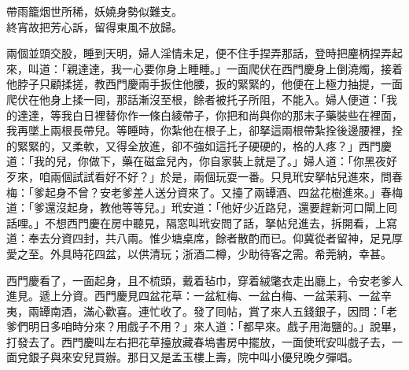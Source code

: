\begin{myquote}
帶雨籠烟世所稀，妖嬈身勢似難支。\\終宵故把芳心訴，留得東風不放歸。
\end{myquote}

兩個並頭交股，睡到天明，婦人淫情未足，便不住手捏弄那話，登時把麈柄捏弄起來，叫道：「親達達，我一心要你身上睡睡。」一面爬伏在西門慶身上倒澆燭，接着他脖子只顧揉搓，教西門慶兩手扳住他腰，扳的緊緊的，他便在上極力抽提，一面爬伏在他身上揉一囘，那話漸沒至根，餘者被托子所阻，不能入。婦人便道：「我的達達，等我白日裡替你作一條白綾帶子，你把和尚與你的那末子藥裝些在裡面，我再墜上兩根長帶兒。等睡時，你紮他在根子上，卻拏這兩根帶紮拴後邊腰裡，拴的緊緊的，又柔軟，又得全放進，卻不強如這托子硬硬的，格的人疼？」{}西門慶道：「我的兒，你做下，藥在磁盒兒內，你自家裝上就是了。」婦人道：「你黑夜好歹來，咱兩個試試看好不好？」於是，兩個玩耍一番。只見玳安拏帖兒進來，問春梅：「爹起身不曾？安老爹差人送分資來了。又擡了兩罈酒、四盆花樹進來。」春梅道：「爹還沒起身，教他等等兒。」玳安道：「他好少近路兒，還要趕新河口閘上囘話哩。」不想西門慶在房中聽見，隔窓叫玳安問了話，拏帖兒進去，拆開看，上寫道：奉去分資四封，共八兩。惟少塘桌席，餘者散酌而已。仰冀從者留神，足見厚愛之至。外具時花四盆，以供清玩；浙酒二樽，少助待客之需。希莞納，幸甚。

西門慶看了，一面起身，且不梳頭，戴着毡巾，穿着絨氅衣走出廳上，令安老爹人進見。遞上分資。西門慶見四盆花草：一盆紅梅、一盆白梅、一盆茉莉、一盆辛夷，兩罈南酒，滿心歡喜。連忙收了。發了囘帖，賞了來人五錢銀子，因問：「老爹們明日多咱時分來？用戲子不用？」來人道：「都早來。戲子用海鹽的。」說畢，打發去了。西門慶叫左右把花草擡放藏春塢書房中擺放，一面使玳安叫戲子去，一面兌銀子與來安兒買辦。那日又是孟玉樓上壽，院中叫小優兒晚夕彈唱。

